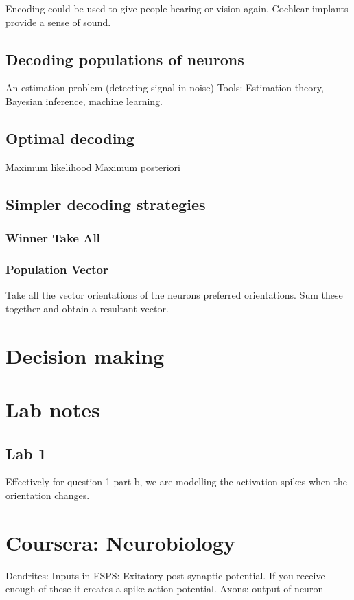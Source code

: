\documentclass[11pt]{article}
\begin{document}
Encoding could be used to give people hearing or vision again. Cochlear implants provide a sense of sound. 

\subsection{Decoding populations of neurons}
An estimation problem (detecting signal in noise)
Tools: Estimation theory, Bayesian inference, machine learning. 

\subsection{Optimal decoding}
Maximum likelihood
Maximum posteriori

\subsection{Simpler decoding strategies}

\subsubsection{Winner Take All}

\subsubsection{Population Vector}
Take all the vector orientations of the neurons preferred orientations. Sum these together and obtain a resultant vector. 

\section{Decision making}


\section{Lab notes}

\subsection{Lab 1}
Effectively for question 1 part b, we are modelling the activation spikes when the orientation changes.

\section{Coursera: Neurobiology}
Dendrites: Inputs in ESPS: Exitatory post-synaptic potential. If you receive enough of these it creates a spike action potential.
Axons: output of neuron
\end{document}
